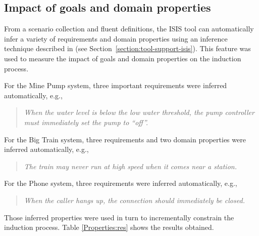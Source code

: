 
\subsection{Impact of goals and domain properties}

From a scenario collection and fluent definitions, the ISIS tool can automatically infer a variety of requirements and domain properties using an inference technique described in \cite{Damas:2006, Damas:2011} (see Section~\ref{section:tool-support-isis}). This feature was used to measure the impact of goals and domain properties on the induction process.

For the Mine Pump system, three important requirements were inferred automatically, e.g.,
\begin{quote}
\emph{When the water level is below the low water threshold, the pump controller must immediately set the pump to ``off''.}
\end{quote}

For the Big Train system, three requirements and two domain properties were inferred automatically, e.g.,
\begin{quote}
\emph{The train may never run at high speed when it comes near a station.}
\end{quote}

For the Phone system, three requirements were inferred automatically, e.g.,

\begin{quote}
\emph{When the caller hangs up, the connection should immediately be closed.}
\end{quote}

Those inferred properties were used in turn to incrementally constrain the induction process. Table \ref{Properties:res} shows the results obtained.

